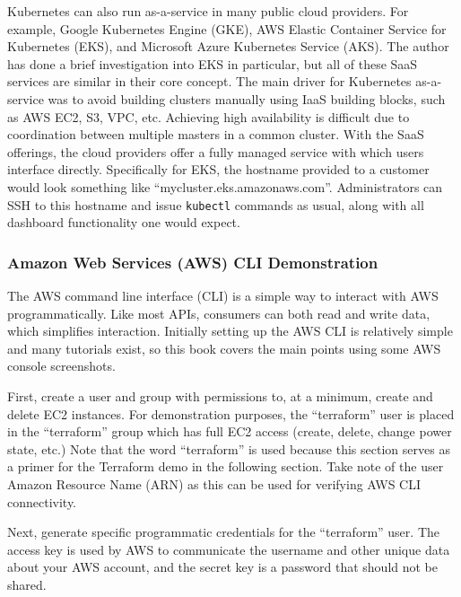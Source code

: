Kubernetes can also run as-a-service in many public cloud providers. For
example, Google Kubernetes Engine (GKE), AWS Elastic Container Service for
Kubernetes (EKS), and Microsoft Azure Kubernetes Service (AKS). The author has
done a brief investigation into EKS in particular, but all of these SaaS
services are similar in their core concept. The main driver for Kubernetes
as-a-service was to avoid building clusters manually using IaaS building
blocks, such as AWS EC2, S3, VPC, etc. Achieving high availability is
difficult due to coordination between multiple masters in a common cluster.
With the SaaS offerings, the cloud providers offer a fully managed service
with which users interface directly. Specifically for EKS, the hostname
provided to a customer would look something like
``mycluster.eks.amazonaws.com''. Administrators can SSH to this hostname and
issue \verb|kubectl| commands as usual, along with all dashboard functionality
one would expect.

\subsubsection{Amazon Web Services (AWS) CLI Demonstration}
The AWS command line interface (CLI) is a simple way to interact with AWS
programmatically. Like most APIs, consumers can both read and write data,
which simplifies interaction. Initially setting up the AWS CLI is relatively
simple and many tutorials exist, so this book covers the main points using
some AWS console screenshots.

First, create a user and group with permissions to, at a minimum, create and
delete EC2 instances. For demonstration purposes, the ``terraform'' user is
placed in the ``terraform'' group which has full EC2 access (create, delete,
change power state, etc.) Note that the word ``terraform'' is used because
this section serves as a primer for the Terraform demo in the following
section. Take note of the user Amazon Resource Name (ARN) as this can be used
for verifying AWS CLI connectivity.



Next, generate specific programmatic credentials for the ``terraform'' user. The
access key is used by AWS to communicate the username and other unique data
about your AWS account, and the secret key is a password that should not be
shared.

